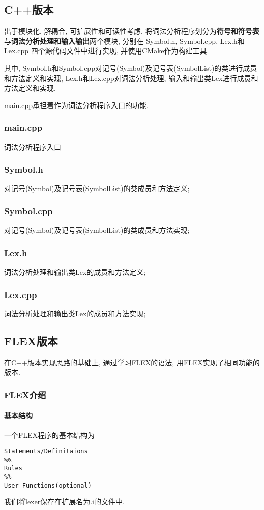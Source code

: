\subsection{C++版本}
出于模块化, 解耦合, 可扩展性和可读性考虑, 将词法分析程序划分为\textbf{符号和符号表}
与\textbf{词法分析处理和输入输出}两个模块, 分别在 Symbol.h, Symbol.cpp, Lex.h和Lex.cpp
四个源代码文件中进行实现, 并使用CMake作为构建工具.

其中, Symbol.h和Symbol.cpp对记号(Symbol)及记号表(SymbolList)的类进行成员和方法定义和实现,
 Lex.h和Lex.cpp对词法分析处理, 输入和输出类Lex进行成员和方法定义和实现.

main.cpp承担着作为词法分析程序入口的功能.

\subsubsection{main.cpp}
词法分析程序入口

\subsubsection{Symbol.h}
对记号(Symbol)及记号表(SymbolList)的类成员和方法定义;

\subsubsection{Symbol.cpp}
对记号(Symbol)及记号表(SymbolList)的类成员和方法实现;

\subsubsection{Lex.h}
词法分析处理和输出类Lex的成员和方法定义;

\subsubsection{Lex.cpp}
词法分析处理和输出类Lex的成员和方法实现;


\subsection{FLEX版本}
在C++版本实现思路的基础上, 通过学习FLEX的语法, 用FLEX实现了相同功能的版本.
\subsubsection{FLEX介绍}
\paragraph{基本结构}
一个FLEX程序的基本结构为
\begin{lstlisting}
Statements/Definitaions
%%
Rules
%%
User Functions(optional)
\end{lstlisting}
我们将lexer保存在扩展名为.i的文件中.

